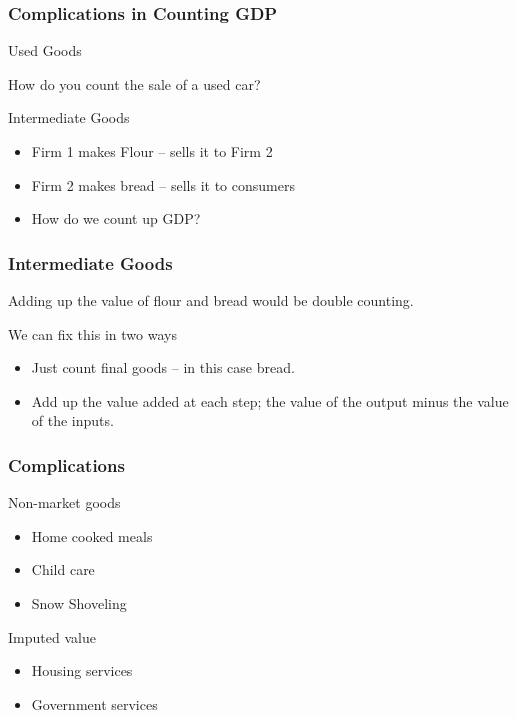 \documentclass[aspectratio=169]{beamer}
\newenvironment{wideitemize}{\itemize\addtolength{\itemsep}{10pt}}{\enditemize}
\begin{document}
\begin{frame}
\frametitle{Complications in Counting GDP}
\begin{wideitemize}
\item Used Goods
\begin{wideitemize}
\item How do you count the sale of a used car?
\end{wideitemize}

\item Intermediate Goods
\begin{itemize}
\item Firm 1 makes Flour – sells it to Firm 2
\item Firm 2 makes bread – sells it to consumers
\item How do we count up GDP?
\end{itemize}
\end{wideitemize}
\end{frame}


\begin{frame}
\frametitle{Intermediate Goods}
\begin{wideitemize}
\item Adding up the value of flour and bread would be double counting.

\item We can fix this in two ways
\begin{itemize}
\item Just count final goods – in this case bread.
\item Add up the value added at each step; the value of the output minus the value of the inputs.
\end{itemize}
\end{wideitemize}
\end{frame}


\begin{frame}
\frametitle{Complications}
\begin{wideitemize}
\item Non-market goods
\begin{itemize}
\item Home cooked meals
\item Child care
\item Snow Shoveling
\end{itemize}
\item Imputed value
\begin{itemize}
\item Housing services
\item Government services
\end{itemize}
\end{wideitemize}

\end{frame}
\end{document}
